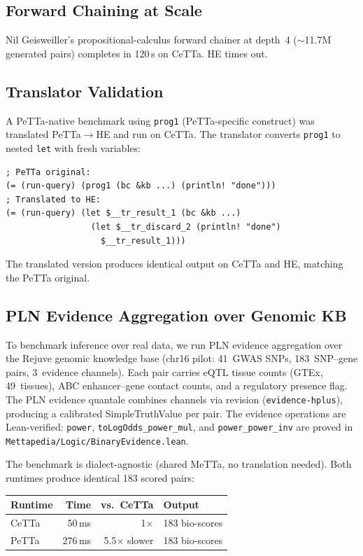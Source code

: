 \documentclass[11pt]{article}
\newcommand{\code}[1]{\texttt{#1}}
\newcommand{\PeTTa}{\textup{PeTTa}}
\newcommand{\HE}{\textup{HE}}
\newcommand{\CeTTa}{\textup{CeTTa}}
\begin{document}
\subsection{Forward Chaining at Scale}

Nil Geisweiller's propositional-calculus forward chainer at depth~4
($\sim$11.7M generated pairs) completes in 120\,s on \CeTTa{}.  \HE{}
times out.

\subsection{Translator Validation}

A PeTTa-native benchmark using \code{prog1} (PeTTa-specific construct)
was translated PeTTa$\to$HE and run on \CeTTa{}.  The translator
converts \code{prog1} to nested \code{let} with fresh variables:
\begin{lstlisting}[language={},basicstyle=\ttfamily\scriptsize]
; PeTTa original:
(= (run-query) (prog1 (bc &kb ...) (println! "done")))
; Translated to HE:
(= (run-query) (let $__tr_result_1 (bc &kb ...)
                 (let $__tr_discard_2 (println! "done")
                   $__tr_result_1)))
\end{lstlisting}
The translated version produces identical output on \CeTTa{} and \HE{},
matching the \PeTTa{} original.

\subsection{PLN Evidence Aggregation over Genomic KB}

To benchmark inference over real data, we run PLN evidence aggregation
over the Rejuve genomic knowledge base (chr16 pilot: 41~GWAS SNPs,
183~SNP--gene pairs, 3~evidence channels).  Each pair carries
eQTL tissue counts (GTEx, 49~tissues), ABC enhancer--gene contact
counts, and a regulatory presence flag.  The PLN evidence quantale
combines channels via revision (\code{evidence-hplus}), producing a
calibrated SimpleTruthValue per pair.  The evidence operations are
Lean-verified: \code{power}, \code{toLogOdds\_power\_mul}, and
\code{power\_power\_inv} are proved in
\code{Mettapedia/Logic/BinaryEvidence.lean}.

The benchmark is dialect-agnostic (shared MeTTa, no translation
needed).  Both runtimes produce identical 183 scored pairs:

\begin{center}
\begin{tabular}{lrrl}
\toprule
Runtime & Time & vs.\ \CeTTa{} & Output \\
\midrule
\CeTTa{} & 50\,ms  & 1$\times$        & 183 bio-scores \\
\PeTTa{} & 276\,ms & 5.5$\times$ slower & 183 bio-scores \\
\bottomrule
\end{tabular}
\end{center}
\end{document}
